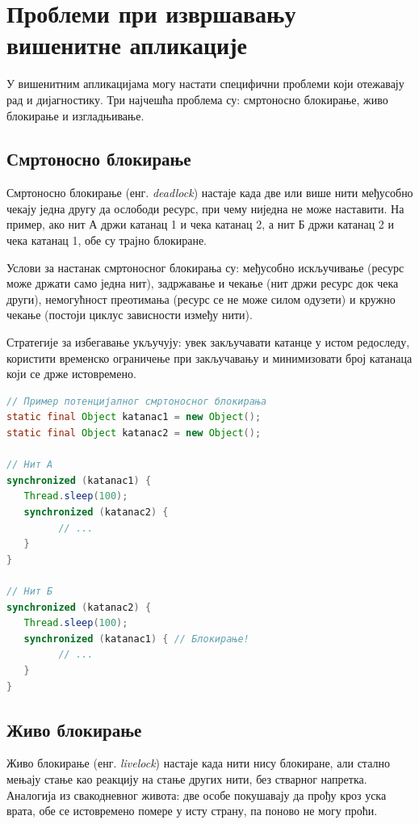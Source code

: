 \section{Проблеми при извршавању вишенитне апликације}

У вишенитним апликацијама могу настати специфични проблеми који отежавају рад и дијагностику. Три најчешћа проблема су: смртоносно блокирање, живо блокирање и изгладњивање.


\subsection{Смртоносно блокирање}

Смртоносно блокирање (енг. \textit{deadlock}) настаје када две или више нити међусобно чекају једна другу да ослободи ресурс, при чему ниједна не може наставити. На пример, ако нит А држи катанац 1 и чека катанац 2, а нит Б држи катанац 2 и чека катанац 1, обе су трајно блокиране.

Услови за настанак смртоносног блокирања су: међусобно искључивање (ресурс може држати само једна нит), задржавање и чекање (нит држи ресурс док чека други), немогућност преотимања (ресурс се не може силом одузети) и кружно чекање (постоји циклус зависности између нити).

Стратегије за избегавање укључују: увек закључавати катанце у истом редоследу, користити временско ограничење при закључавању и минимизовати број катанаца који се држе истовремено.


\begin{lstlisting}[language=Java]
// Пример потенцијалног смртоносног блокирања
static final Object katanac1 = new Object();
static final Object katanac2 = new Object();
 
// Нит А
synchronized (katanac1) {
   Thread.sleep(100);
   synchronized (katanac2) {
         // ...
   }
}
 
// Нит Б
synchronized (katanac2) {
   Thread.sleep(100);
   synchronized (katanac1) { // Блокирање!
         // ...
   }
}
\end{lstlisting}


\subsection{Живо блокирање}

Живо блокирање (енг. \textit{livelock}) настаје када нити нису блокиране, али стално мењају стање као реакцију на стање других нити, без стварног напретка. Аналогија из свакодневног живота: две особе покушавају да прођу кроз уска врата, обе се истовремено помере у исту страну, па поново не могу проћи.

